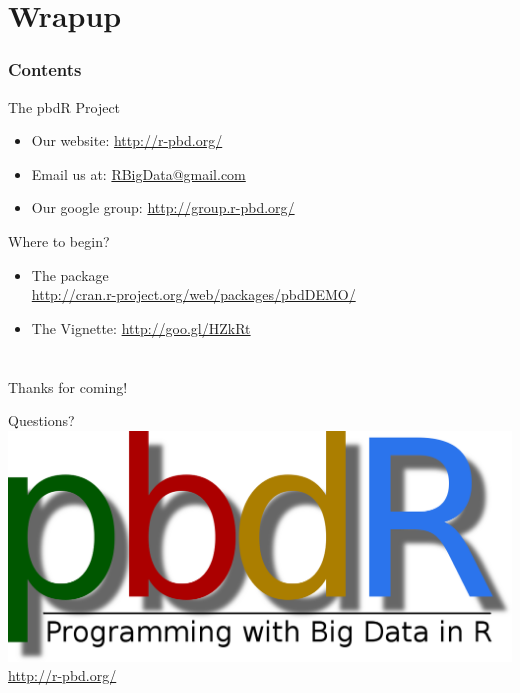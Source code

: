 \section{Wrapup}

\hidenum
\begin{frame}[noframenumbering]
\frametitle{Contents}
 \tableofcontents[currentsection,hideothersubsections,sectionstyle=show/hide]
\end{frame}
\shownum

\begin{frame}
  \begin{block}{The pbdR Project}
    \begin{itemize}
      \item Our website: \url{http://r-pbd.org/}
      \item Email us at: \url{RBigData@gmail.com}
      \item Our google group: \url{http://group.r-pbd.org/}
     \end{itemize}
\end{block}
  \begin{block}{Where to begin?}
    \begin{itemize}
      \item The  package\\
      \url{http://cran.r-project.org/web/packages/pbdDEMO/}\\
      \item The  Vignette: \url{http://goo.gl/HZkRt}
    \end{itemize}
\end{block}
\end{frame}


\section*{}



\begin{frame}[noframenumbering]
 \begin{block}{Thanks for coming!}
 \begin{center}
 \vspace{.4cm}
     {\Huge Questions?}\\[.8cm]
\includegraphics[scale=.1]{../common/pics/logos/newpbdr}
\\[.4cm]
\url{http://r-pbd.org/}
  \end{center}
 \end{block}
\end{frame}
